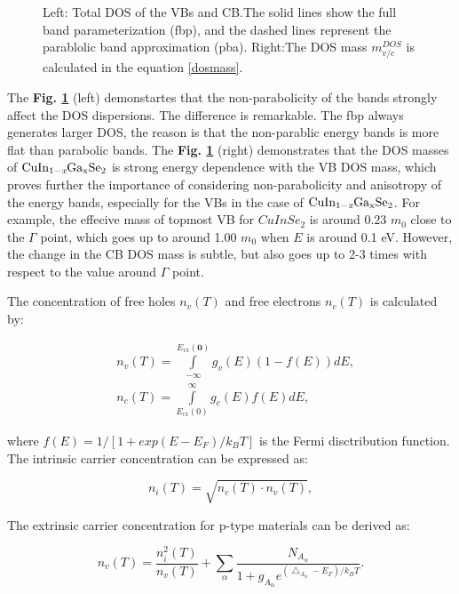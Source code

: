 \documentclass[a4paper, 12pt, titlepage,oneside,drop]{kthesis}
\begin{document}
\begin{figure}[H]
\begin{center}
     \end{center}
    \caption{Left: Total DOS of the VBs and CB.The solid lines show the full band parameterization (fbp), and the dashed lines represent the parablolic band approximation (pba).
Right:The DOS mass $m_{v/c}^{DOS}$ is calculated in the equation \ref{dosmass}. }
   \label{dost}
\end{figure}

The \textbf{Fig. \ref{dost}} (left) demonstartes that the non-parabolicity of the bands strongly affect the DOS dispersions. The difference is remarkable. The fbp always
generates larger DOS, the reason is that the non-parablic energy bands is more flat than parabolic bands. The \textbf{Fig. \ref{dost}} (right) demonstrates that the DOS masses of $\mathrm { CuIn_{1-\textit{x}}Ga_{x}Se_2}$ is strong energy dependence with the VB DOS mass, which proves further the importance of considering 
non-parabolicity and anisotropy of the energy bands, especially for the VBs in the case of $\mathrm { CuIn_{1-\textit{x}}Ga_{x}Se_2}$. For example, the effecive mass of topmost VB for $CuInSe_2$ is around 
0.23 $m_0$ close to the $\Gamma$ point, which goes up to around 1.00 $m_0$ when $E$ is around 0.1 eV. However, the change in the CB DOS mass is subtle, but also goes up to 2-3 times 
with respect to the value around $\Gamma$ point.

The concentration of free holes $n_v(T)$ and free electrons $n_c(T)$ is calculated by:

\begin{equation}
\begin{split}
& n_v(T) = \int \limits_{-\infty}^{E_{v1}(\textbf{0})} g_v(E)(1-f(E))dE,\\
& n_c(T) = \int \limits_{E_{c1}(0)}^{\infty} g_c(E)f(E)dE, 
\end{split}
\end{equation}

where $f(E) = 1/[1+exp{(E-E_F)/k_BT}]$ is the Fermi disctribution function. The intrinsic carrier concentration can be expressed as:

\begin{equation}\label{cc}
 n_i(T) = \sqrt{n_c(T) \cdot n_v(T)} ,
\end{equation}
 
The extrinsic carrier concentration for p-type materials can be derived as:

\begin{equation}\label{ecc}
n_v(T) = \frac{n_i^2(T)}{n_v(T)} + \sum \limits_{\alpha} \frac{N_{A_{\alpha}}} {1+g_{A_{\alpha}} e^{ (\bigtriangleup_{A_{\alpha}}-E_F)/k_BT }}. 
\end{equation}
\end{document}
